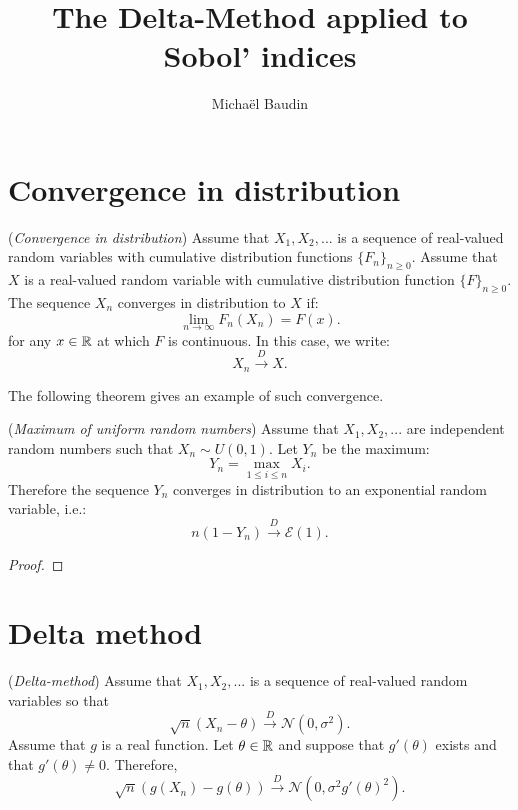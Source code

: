 \documentclass{article}
\begin{document}
\title{The Delta-Method applied to Sobol' indices}

\author{Michaël Baudin}

\maketitle



\tableofcontents


\section{Convergence in distribution}

\begin{definition}
(\emph{Convergence in distribution})
Assume that $X_1,X_2,...$ is a sequence of real-valued random variables 
with cumulative distribution functions $\{F_n\}_{n\geq 0}$. 
Assume that $X$ is a real-valued random variable 
with cumulative distribution function $\{F\}_{n\geq 0}$. 
The sequence $X_n$ converges in distribution to $X$ if:
$$
\lim_{n\rightarrow \infty} F_n(X_n)=F(x).
$$
for any $x\in \mathbb{R}$ at which $F$ is continuous.
In this case, we write:
$$
X_n \xrightarrow{D} X.
$$
\end{definition}

The following theorem gives an example of such convergence. 

\begin{theorem}
(\emph{Maximum of uniform random numbers})
Assume that $X_1,X_2,...$ are independent random numbers such that $X_n\sim U(0,1)$. 
Let $Y_n$ be the maximum:
$$
Y_n = \max_{1\leq i\leq n}  X_i.
$$
Therefore the sequence $Y_n$ converges in distribution to an exponential random variable, i.e.:
$$
n(1-Y_n) \xrightarrow{D} \mathcal{E}(1).
$$
\end{theorem}

\begin{proof}
\end{proof}



\section{Delta method}

\begin{theorem}
(\emph{Delta-method})
Assume that $X_1,X_2,...$ is a sequence of real-valued random variables 
so that 
$$
\sqrt{n} (X_n - \theta) \xrightarrow{D} \mathcal{N}(0,\sigma^2).
$$
Assume that $g$ is a real function. 
Let $\theta\in\mathbb{R}$ and suppose that $g'(\theta)$ exists and that $g'(\theta)\neq 0$. 
Therefore, 
$$
\sqrt{n} (g(X_n) - g(\theta)) \xrightarrow{D} \mathcal{N}(0,\sigma^2 g'(\theta)^2).
$$
\end{theorem}

%




\end{document}

